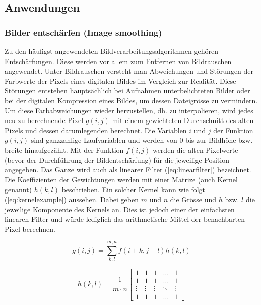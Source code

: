 \subsection{Anwendungen}

\subsubsection{Bilder entschärfen (Image smoothing)}

Zu den häufigst angewendeten Bildverarbeitungsalgorithmen gehören Entschärfungen. Diese werden vor allem zum Entfernen von Bildrauschen angewendet. Unter Bildrauschen versteht man Abweichungen und Störungen der Farbwerte der Pixels eines digitalen Bildes im Vergleich zur Realität. Diese Störungen entstehen hauptsächlich bei Aufnahmen unterbelichteten Bilder oder bei der digitalen Kompression eines Bildes, um dessen Dateigrösse zu vermindern. Um diese Farbabweichungen wieder herzustellen, dh. zu interpolieren, wird jedes neu zu berechnende Pixel $g(i,j)$ mit einem gewichteten Durchschnitt des alten Pixels und dessen darumlegenden berechnet. Die Variablen $i$ und $j$ der Funktion $g(i,j)$ sind ganzzahlige Laufvariablen und werden von $0$ bis zur Bildhöhe bzw. -breite hinaufgezählt. Mit der Funktion $f(i,j)$ werden die alten Pixelwerte (bevor der Durchführung der Bildentschärfung) für die jeweilige Position angegeben. Das Ganze wird auch als linearer Filter (\ref{eq:linearfilter}) bezeichnet. Die Koeffizienten der Gewichtungen werden mit einer Matrize (auch Kernel genannt) $h(k,l)$ beschrieben. Ein solcher Kernel kann wie folgt (\ref{eq:kernelexample}) aussehen. Dabei geben $m$ und $n$ die Grösse  und $h$ bzw. $l$ die jeweilige Komponente des Kernels an. Dies ist jedoch einer der einfachsten linearen Filter und würde lediglich das arithmetische Mittel der benachbarten Pixel berechnen.  \cite{opencv_bradski_kaehler:1, opencv_doc_blur:1}

\begin{equation}
	g(i,j) = \sum_{k,l}^{m,n} f(i+k,j+l)h(k,l)
	\label{eq:linearfilter}
\end{equation}
\cite{opencv_doc_blur:1}



\begin{equation}
	h(k,l) = \frac{1}{m \cdot n}
	\begin{bmatrix}
  	1      & 1      & 1      & \dots  &      1 \\
	1      & 1      & 1      & \dots  &      1 \\
	 \vdots & \vdots & \vdots & \ddots & \vdots \\
	 1      & 1      & 1      & \dots  &      1
	\end{bmatrix}	
	\label{eq:kernelexample}
\end{equation}
\cite{opencv_doc_blur:1}


